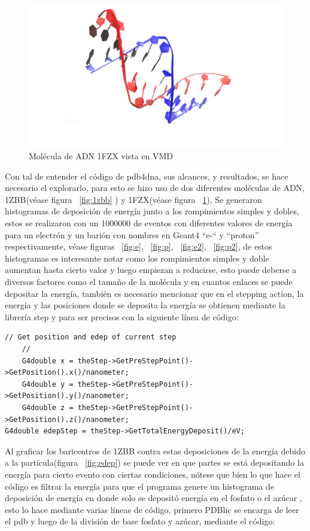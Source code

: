 \begin{figure}[htbp]
    \centering
    \includegraphics[width=0.8\linewidth]{./Figures/1FZX.png}
    \caption[Molécula de ADN 1FZX]{Molécula de ADN 1FZX vista en VMD}
    \label{fig:1fzx}
\end{figure}
Con tal de entender el código de pdb4dna, sus alcances, y resultados, se hace necesario el explorarlo, para esto se hizo uso de dos diferentes moléculas de ADN, 1ZBB(véase figura ~\ref{fig:1zbb} ) y 1FZX(véase figura ~\ref{fig:1fzx}), Se generaron histogramas de deposición de energía junto a los rompimientos simples y dobles, estos se realizaron con un 1000000 de eventos con diferentes valores de energía para un electrón y un barión con nombres en Geant4 “e-“ y “proton” respectivamente, véase figuras ~\ref{fig:e}, ~\ref{fig:p}, ~\ref{fig:e2}, ~\ref{fig:p2}, de estos histogramas es interesante notar como los rompimientos simples y doble aumentan hasta cierto valor y luego empiezan a reducirse, esto puede deberse a diversos factores como el tamaño de la molécula y en cuantos enlaces se puede depositar la energía, también es necesario mencionar que en el stepping action, la energía y las posiciones donde se deposita la energía se obtienen mediante la librería step y para ser precisos con la siguiente línea de código:
\lstset {language=C++}
\begin{lstlisting}
// Get position and edep of current step
    //
    G4double x = theStep->GetPreStepPoint()->GetPosition().x()/nanometer;
    G4double y = theStep->GetPreStepPoint()->GetPosition().y()/nanometer;
    G4double z = theStep->GetPreStepPoint()->GetPosition().z()/nanometer;
G4double edepStep = theStep->GetTotalEnergyDeposit()/eV;
\end{lstlisting}

Al graficar los baricentros de 1ZBB contra estas deposiciones de la energía debido a la partícula(figura ~\ref{fig:edep}) se puede ver en que partes se está depositando la energía para cierto evento con ciertas condiciones, nótese que  bien lo que hace el código es filtrar la energía para que el programa genere un histograma de deposición de energía en donde solo se depositó energía en el fosfato o el azúcar , esto lo hace mediante varias líneas de código, primero PDBlic se encarga de leer el pdb y luego de la división de base fosfato y azúcar, mediante el código:

